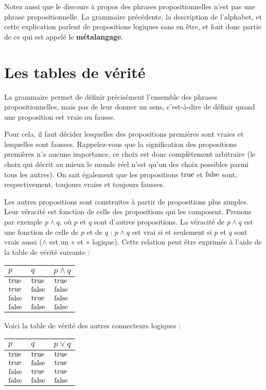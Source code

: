 Notez aussi que le discours à propos des phrases propositionnelles n’est
pas une phrase propositionnelle. La grammaire précédente, la description de
l’alphabet, et cette explication parlent de propositions logiques sans en
être, et font donc partie de ce qui est appelé le \textbf{métalangage}.

\section{Les tables de vérité}

La grammaire permet de définir précisément l’ensemble des phrases
propositionnelles, mais pas de leur donner un sens, c’est-à-dire de définir
quand une proposition est vraie ou fausse.

Pour cela, il faut décider lesquelles des propositions premières sont vraies
et lesquelles sont fausses. Rappelez-vous que la signification des
propositions premières n’a aucune importance, ce choix est donc complètement
arbitraire (le choix qui décrit au mieux le monde réel n’est qu’un des choix
possibles parmi tous les autres). On sait également que les propositions
$\mathrm{true}$ et $\mathrm{false}$ sont, respectivement, toujours vraies et toujours
fausses.

Les autres propositions sont construites à partir de propositions plus
simples. Leur véracité est fonction de celle des propositions qui les
composent. Prenons par exemple $p \land q$, où $p$ et $q$ sont d’autres
propositions. La véracité de $p \land q$ est une fonction de celle de $p$ et
de $q$ : $p \land q$ est vrai si et seulement si $p$ et $q$ sont vrais aussi
($\land$ est un « et » logique). Cette relation peut être exprimée à l’aide
de la table de vérité suivante :

\vspace{2 mm}
\begin{tabular}{ll|l}
  $p$ & $q$ & $p \land q$ \\
  \hline

  $\mathrm{true}$ & $\mathrm{true}$ & $\mathrm{true}$ \\
  $\mathrm{true}$ & $\mathrm{false}$ & $\mathrm{false}$ \\
  $\mathrm{false}$ & $\mathrm{true}$ & $\mathrm{false}$ \\
  $\mathrm{false}$ & $\mathrm{false}$ & $\mathrm{false}$
\end{tabular}

\vspace{2 mm}
Voici la table de vérité des autres connecteurs logiques :
\vspace{2 mm}

\begin{tabular}{ll|l}
  $p$ & $q$ & $p \lor q$ \\
  \hline

  $\mathrm{true}$ & $\mathrm{true}$ & $\mathrm{true}$ \\
  $\mathrm{true}$ & $\mathrm{false}$ & $\mathrm{true}$ \\
  $\mathrm{false}$ & $\mathrm{true}$ & $\mathrm{true}$ \\
  $\mathrm{false}$ & $\mathrm{false}$ & $\mathrm{false}$
\end{tabular}
\vspace{2 mm}

